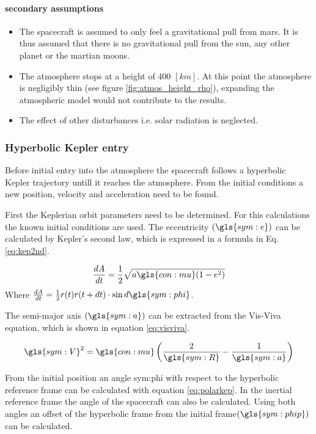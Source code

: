  
 \paragraph{secondary assumptions}
 \begin{itemize}
 \item The spacecraft is assumed to only feel a gravitational pull from mars. It is thus assumed that there is no gravitational pull from the sun, any other planet or the martian moons.
 \item The atmosphere stops at a height of 400 $\left[km\right]$. At this point the atmosphere is negligibly thin (see figure \ref{fig:atmos_height_rho}),  expanding the atmospheric model would not contribute to the results.
 \item The effect of other disturbances i.e. solar radiation is neglected.

 \end{itemize}
 
\subsubsection{Hyperbolic Kepler entry}
 \label{sec:hypkep}
Before initial entry into the atmosphere the spacecraft follows a hyperbolic Kepler trajectory untill it reaches the atmosphere. From the initial conditions a new position, velocity and acceleration need to be found. 

First the Keplerian orbit parameters need to be determined. For this calculations the known initial conditions are used. The eccentricity $\left(\gls{sym:e}\right)$ can be calculated by Kepler's second law, which is expressed in a formula in Eq. \ref{eq:kep2nd}.

\begin{equation}
\frac{dA}{dt} = \frac{1}{2}\sqrt{a\gls{con:mu}(1-e^2)}
\label{eq:kep2nd}
\end{equation}
Where $\frac{dA}{dt} = \frac{1}{2}r(t)r(t+dt) \cdot \sin{d\gls{sym:phi}}$.

The semi-major axis $\left(\gls{sym:a}\right)$ can be extracted from the Vis-Viva equation, which is shown in equation \ref{eq:visviva}.

\begin{equation}
\gls{sym:V}^2 = \gls{con:mu}\left(\frac{2}{\gls{sym:R}}-\frac{1}{\gls{sym:a}}\right)
\label{eq:visviva}
\end{equation}

From the initial position an angle \gls{sym:phi} with respect to the hyperbolic reference frame can be calculated with equation \ref{eq:polarkep}. In the inertial reference frame the angle of the spacecraft can also be calculated. Using both angles an offset of the hyperbolic frame from the initial frame$\left (\gls{sym:phip}\right)$ can be calculated.

